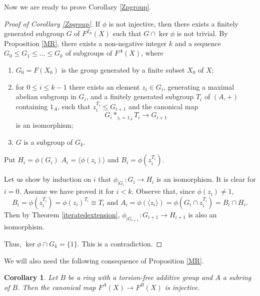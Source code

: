 \documentclass[11pt]{amsart}
\newtheorem{cor}[lem]{Corollary}
\numberwithin{claimcounter}{lem}
\newcommand{\Z}{\mathbb{Z}}
\begin{document}
Now we are ready to prove Corollary \ref{Zpgroup}.
  \begin{proof}[Proof of Corollary \ref{Zpgroup}]
  If $\phi$ is not injective, then there exists a finitely generated subgroup $G$ of $F^{\Z_p}(X)$ such that $G\cap \ker \phi$ is not trivial. By  Proposition \ref{MR},  there exists  a non-negative integer $k$ and a sequence $G_0\le G_1\le \ldots \le  G_k$ of subgroups of $F^A(X)$, where 
  \begin{enumerate}
  \item [(a)] $G_0=F(X_0)$ is the group generated by a finite subset $X_0$ of $X$;
  \item [(b)]   for $0\le i\le k-1$ there exists an element $z_i\in G_i$, generating a maximal abelian subgroup in $G_i$, and a  finitely generated subgroup $T_i$ of $(A,+)$ containing $1_A$, such that $z_i^{T_i}\le G_{i+1}$ and the canonical map $$G_{i}*_{z_i=1_A}T_i \to G_{i+1}$$ is an isomorphism;
  \item[(c)] $G$ is   a subgroup of $G_k$.
\end{enumerate}  Put $H_i=\phi(G_i)$ $A_i=\langle \phi(z_i)\rangle$ and $B_i=\phi(z_i^{T_i})$. 
  
  Let us show by induction on $i$ that $\phi_{|G_i}:G_i\to H_i$ is an isomorphism. It is clear for $i=0$. Assume we have proved it for $i<k$. Observe that, since $\phi(z_i)\ne 1$, $$B_i=\phi(z_i^{T_i})=\phi(z_i)^{T_i}\cong T_i \textrm{\ and \ } A_i=\phi(\langle z_i\rangle)=\phi(G_i\cap z_i^{T_i})=B_i\cap H_i.$$
  Then by Theorem \ref{iteratedextension}, $\phi_{|G_{i+1}}:G_{i+1}\to H_{i+1}$ is also an isomorphism.
  
  Thus, $\ker \phi \cap G_k=\{1\}$. This is a contradiction. 
  \end{proof}
  
We will also need the following consequence of Proposition \ref{MR}.
\begin{cor}\cite[Corollary 5]{MR96} \label{extring}
Let $B$ be  a ring with a torsion-free additive group and $A$ a subring of $B$. Then the canonical map $F^A(X)\to F^B(X)$ is injective.
\end{cor}  
  
   
\end{document}

